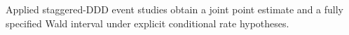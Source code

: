 Applied staggered-DDD event studies obtain a joint point estimate and a fully specified Wald interval under explicit conditional rate hypotheses.